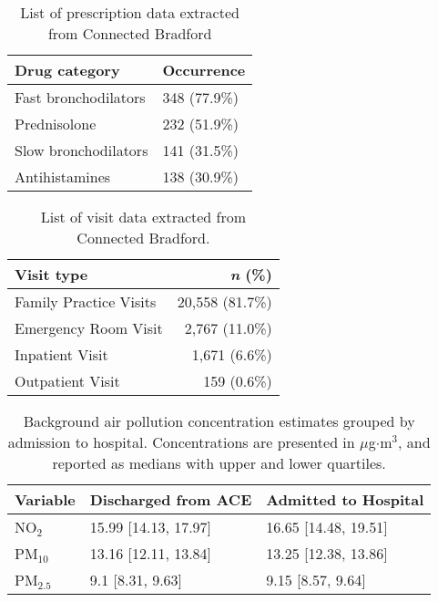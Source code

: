 \begin{table}[H]
   \caption{List of prescription data extracted from Connected Bradford}
\centering
\begin{tabular}{ll}
  \hline
Drug category & Occurrence \\ 
  \hline
Fast bronchodilators & 348 (77.9\%) \\ 
  Prednisolone & 232 (51.9\%) \\ 
  Slow bronchodilators & 141 (31.5\%) \\ 
  Antihistamines & 138 (30.9\%) \\ 
   \hline
\end{tabular}\label{tab:additional-prescription-table}
\end{table}

\begin{table}[H]
   \caption{List of visit data extracted from Connected Bradford.}
\centering
\begin{tabular}{lr}
  \hline
Visit type & \textit{n} (\%) \\ 
  \hline
Family Practice Visits & 20,558 (81.7\%) \\ 
  Emergency Room Visit & 2,767 (11.0\%) \\ 
  Inpatient Visit & 1,671 (6.6\%) \\ 
  Outpatient Visit & 159 (0.6\%) \\ 
   \hline
\end{tabular}\label{tab:additional-visit-table}
\end{table}

\begin{table}[H]
   \caption[Background air pollution concentration estimates grouped by admission to hospital]{Background air pollution concentration estimates grouped by admission to hospital. Concentrations are presented in $\mu$g$\cdot$m$^3$, and reported as medians with upper and lower quartiles.}
\centering
\begin{tabular}{lll}
  \hline
Variable & Discharged from ACE & Admitted to Hospital \\ 
  \hline
NO$_2$ & 15.99 [14.13, 17.97] & 16.65 [14.48, 19.51] \\ 
  PM$_{10}$ & 13.16 [12.11, 13.84] & 13.25 [12.38, 13.86] \\ 
  PM$_{2.5}$ & 9.1 [8.31, 9.63] & 9.15 [8.57, 9.64] \\ 
   \hline
\end{tabular}\label{tab:additional-air-table}
\end{table}

